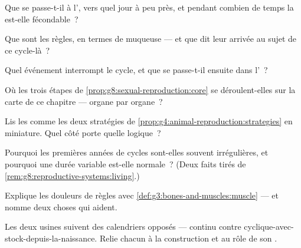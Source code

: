 \begin{exercise}[$\star$]\label{exo:g8:reproductive-systems:4}
Que se passe-t-il à l', vers quel jour à peu près, et
pendant combien de temps la  est-elle fécondable~?
\end{exercise}

\begin{exercise}[$\star$]\label{exo:g8:reproductive-systems:5}
Que sont les règles, en termes de muqueuse --- et que dit leur
arrivée au sujet de ce cycle-là~?
\end{exercise}

\begin{exercise}[$\star$]\label{exo:g8:reproductive-systems:6}
Quel événement interrompt le cycle, et que se passe-t-il ensuite
dans l'~?
\end{exercise}

\begin{exercise}[$\star\star$]\label{exo:g8:reproductive-systems:7}
Où les trois étapes de \cref{prop:g8:sexual-reproduction:core} se
déroulent-elles sur la carte de ce chapitre --- organe par organe~?
\end{exercise}

\begin{exercise}[$\star\star$]\label{exo:g8:reproductive-systems:8}
Lis les  comme les deux stratégies de
\cref{prop:g4:animal-reproduction:strategies} en miniature. Quel
côté porte quelle logique~?
\end{exercise}

\begin{exercise}[$\star\star$]\label{exo:g8:reproductive-systems:9}
Pourquoi les premières années de cycles sont-elles souvent
irrégulières, et pourquoi une durée variable est-elle normale~?
(Deux faits tirés de \cref{rem:g8:reproductive-systems:living}.)
\end{exercise}

\begin{exercise}[$\star\star$]\label{exo:g8:reproductive-systems:10}
Explique les douleurs de règles avec
\cref{def:g3:bones-and-muscles:muscle} --- et nomme deux choses qui
aident.
\end{exercise}

\begin{exercise}[$\star\star$]\label{exo:g8:reproductive-systems:11}
Les deux usines suivent des calendriers opposés --- continu contre
cyclique-avec-stock-depuis-la-naissance. Relie chacun à la
construction et au rôle de son .
\end{exercise}

